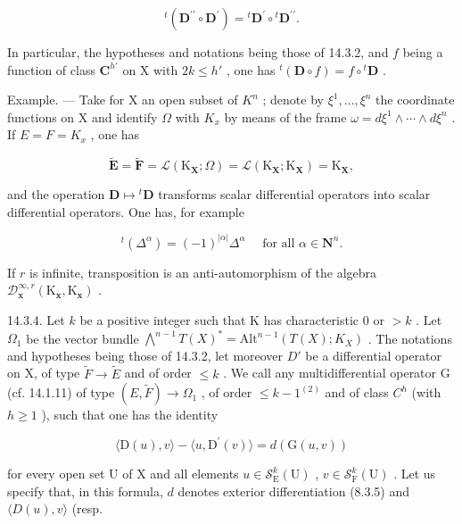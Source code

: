 \[
{ } ^ { t } ( \mathbf { D } ^ { \prime \prime } \circ \mathbf { D } ^ { \prime } ) = { } ^ { t } \mathbf { D } ^ { \prime } \circ { } ^ { t } \mathbf { D } ^ { \prime \prime } .
\]

In particular, the hypotheses and notations being those of 14.3.2, and \(f\) being a function of class \(\mathbf{C}^{h'}\) on X with \(2k \leqslant h'\) , one has \({}^t(\mathbf{D} \circ f) = f \circ {}^t\mathbf{D}\) .

Example. --- Take for X an open subset of \(K^{n}\) ; denote by \(\xi^{1}, \ldots, \xi^{n}\) the coordinate functions on X and identify \(\Omega\) with \(K_{x}\) by means of the frame \(\omega = d\xi^{1} \wedge \cdots \wedge d\xi^{n}\) . If \(E = F = K_{x}\) , one has

\[
\tilde {\mathbf {E}} = \tilde {\mathbf {F}} = \mathcal {L} (\mathrm{K}_{\mathbf{X}}; \Omega) = \mathcal {L} (\mathrm{K}_{\mathbf{X}}; \mathrm{K}_{\mathbf{X}}) = \mathrm{K}_{\mathbf{X}},
\]

and the operation \(\mathbf{D} \mapsto {}^{t}\mathbf{D}\) transforms scalar differential operators into scalar differential operators. One has, for example

\[
{ } ^ { t } ( \Delta ^ { \alpha } ) = ( - 1 ) ^ { | \alpha | } \Delta ^ { \alpha } \quad \text { for all } \alpha \in \mathbf {N} ^ { n } .
\]

If \(r\) is infinite, transposition is an anti-automorphism of the algebra \(\mathcal{D}_{\mathbf{x}}^{\infty,r}(\mathrm{K}_{\mathbf{x}},\mathrm{K}_{\mathbf{x}})\) .

14.3.4. Let \(k\) be a positive integer such that K has characteristic 0 or \(>k\) . Let \(\Omega_{1}\) be the vector bundle \(\bigwedge^{n-1}T(X)^{*} = \text{Alt}^{n-1}(T(X); K_{X})\) . The notations and hypotheses being those of 14.3.2, let moreover \(D'\) be a differential operator on X, of type \(\widetilde{F} \to \widetilde{E}\) and of order \(\leqslant k\) . We call any multidifferential operator G (cf. 14.1.11) of type \((E, \widetilde{F}) \to \Omega_{1}\) , of order \(\leqslant k - 1^{(2)}\) and of class \(C^{h}\) (with \(h \geqslant 1\) ), such that one has the identity

\[
\langle \mathrm{D} (u), v \rangle - \langle u, \mathrm{D} ^ {\prime} (v) \rangle = d (\mathrm{G} (u, v))\tag{1}
\]

for every open set U of X and all elements \(u \in \mathcal{S}_{\mathrm{E}}^{k}(\mathrm{U})\) , \(v \in \mathcal{S}_{\mathrm{F}}^{k}(\mathrm{U})\) . Let us specify that, in this formula, \(d\) denotes exterior differentiation (8.3.5) and \(\langle D(u), v \rangle\) (resp.

